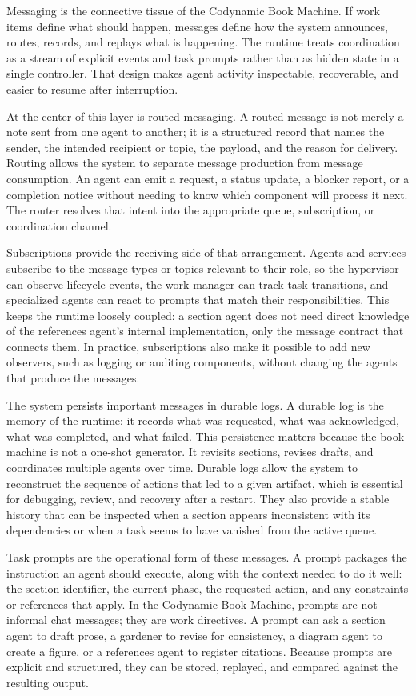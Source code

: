 \documentclass[11pt]{article}
\begin{document}
Messaging is the connective tissue of the Codynamic Book Machine. If work items define what should happen, messages define how the system announces, routes, records, and replays what is happening. The runtime treats coordination as a stream of explicit events and task prompts rather than as hidden state in a single controller. That design makes agent activity inspectable, recoverable, and easier to resume after interruption.

At the center of this layer is routed messaging. A routed message is not merely a note sent from one agent to another; it is a structured record that names the sender, the intended recipient or topic, the payload, and the reason for delivery. Routing allows the system to separate message production from message consumption. An agent can emit a request, a status update, a blocker report, or a completion notice without needing to know which component will process it next. The router resolves that intent into the appropriate queue, subscription, or coordination channel.

Subscriptions provide the receiving side of that arrangement. Agents and services subscribe to the message types or topics relevant to their role, so the hypervisor can observe lifecycle events, the work manager can track task transitions, and specialized agents can react to prompts that match their responsibilities. This keeps the runtime loosely coupled: a section agent does not need direct knowledge of the references agent's internal implementation, only the message contract that connects them. In practice, subscriptions also make it possible to add new observers, such as logging or auditing components, without changing the agents that produce the messages.

The system persists important messages in durable logs. A durable log is the memory of the runtime: it records what was requested, what was acknowledged, what was completed, and what failed. This persistence matters because the book machine is not a one-shot generator. It revisits sections, revises drafts, and coordinates multiple agents over time. Durable logs allow the system to reconstruct the sequence of actions that led to a given artifact, which is essential for debugging, review, and recovery after a restart. They also provide a stable history that can be inspected when a section appears inconsistent with its dependencies or when a task seems to have vanished from the active queue.

Task prompts are the operational form of these messages. A prompt packages the instruction an agent should execute, along with the context needed to do it well: the section identifier, the current phase, the requested action, and any constraints or references that apply. In the Codynamic Book Machine, prompts are not informal chat messages; they are work directives. A prompt can ask a section agent to draft prose, a gardener to revise for consistency, a diagram agent to create a figure, or a references agent to register citations. Because prompts are explicit and structured, they can be stored, replayed, and compared against the resulting output.
\end{document}
